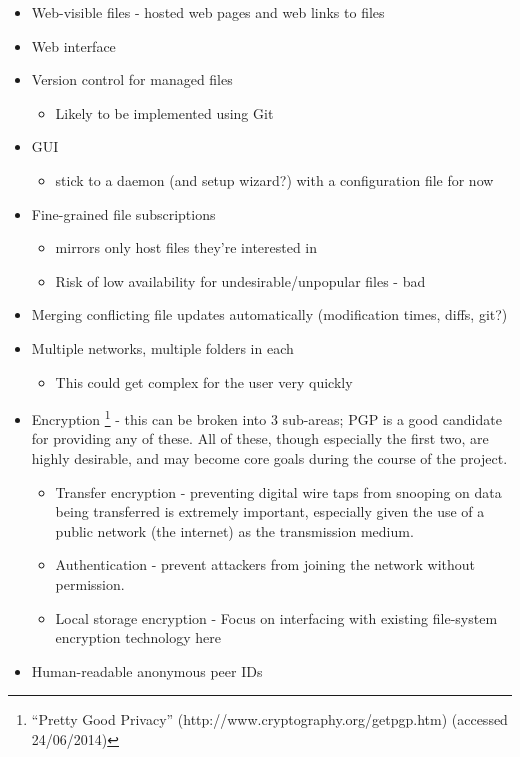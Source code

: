 \documentclass[12pt,a4paper,]{adreport}
\begin{document}
\begin{itemize}
\itemsep1pt\parskip0pt
\item
  Web-visible files - hosted web pages and web links to files
\item
  Web interface
\item
  Version control for managed files

  \begin{itemize}
  \itemsep1pt\parskip0pt
  \item
    Likely to be implemented using Git
  \end{itemize}
\item
  GUI

  \begin{itemize}
  \itemsep1pt\parskip0pt
  \item
    stick to a daemon (and setup wizard?) with a configuration file for
    now
  \end{itemize}
\item
  Fine-grained file subscriptions

  \begin{itemize}
  \itemsep1pt\parskip0pt
  \item
    mirrors only host files they're interested in
  \item
    Risk of low availability for undesirable/unpopular files - bad
  \end{itemize}
\item
  Merging conflicting file updates automatically (modification times,
  diffs, git?)
\item
  Multiple networks, multiple folders in each

  \begin{itemize}
  \itemsep1pt\parskip0pt
  \item
    This could get complex for the user very quickly
  \end{itemize}
\item
  Encryption \footnote{``Pretty Good Privacy''
    (http://www.cryptography.org/getpgp.htm) (accessed 24/06/2014)} -
  this can be broken into 3 sub-areas; PGP is a good candidate for
  providing any of these. All of these, though especially the first two,
  are highly desirable, and may become core goals during the course of
  the project.

  \begin{itemize}
  \itemsep1pt\parskip0pt
  \item
    Transfer encryption - preventing digital wire taps from snooping on
    data being transferred is extremely important, especially given the
    use of a public network (the internet) as the transmission medium.
  \item
    Authentication - prevent attackers from joining the network without
    permission.
  \item
    Local storage encryption - Focus on interfacing with existing
    file-system encryption technology here
  \end{itemize}
\item
  Human-readable anonymous peer IDs


\end{itemize}
\end{document}
